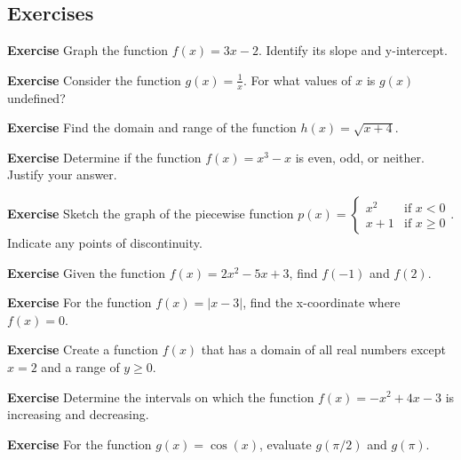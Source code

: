 \documentclass[a4paper,12pt]{book}
\newenvironment{exercise}[1][]
  {\par\medskip\noindent\textbf{Exercise #1} \rmfamily}
  {\medskip}
\begin{document}
\subsection{Exercises}
\begin{exercise}
Graph the function \( f(x) = 3x - 2 \). Identify its slope and y-intercept.
\end{exercise}

\begin{exercise}
Consider the function \( g(x) = \frac{1}{x} \). For what values of \( x \) is \( g(x) \) undefined?
\end{exercise}

\begin{exercise}
Find the domain and range of the function \( h(x) = \sqrt{x + 4} \).
\end{exercise}

\begin{exercise}
Determine if the function \( f(x) = x^3 - x \) is even, odd, or neither. Justify your answer.
\end{exercise}

\begin{exercise}
Sketch the graph of the piecewise function \( p(x) = \left\{\begin{array}{ll} x^2 & \text{if } x < 0 \\ x + 1 & \text{if } x \geq 0 \end{array}\right. \). Indicate any points of discontinuity.
\end{exercise}

\begin{exercise}
Given the function \( f(x) = 2x^2 - 5x + 3 \), find \( f(-1) \) and \( f(2) \).
\end{exercise}

\begin{exercise}
For the function \( f(x) = |x - 3| \), find the x-coordinate where \( f(x) = 0 \).
\end{exercise}

\begin{exercise}
Create a function \( f(x) \) that has a domain of all real numbers except \( x = 2 \) and a range of \( y \geq 0 \).
\end{exercise}

\begin{exercise}
Determine the intervals on which the function \( f(x) = -x^2 + 4x - 3 \) is increasing and decreasing.
\end{exercise}

\begin{exercise}
For the function \( g(x) = \cos(x) \), evaluate \( g(\pi/2) \) and \( g(\pi) \).
\end{exercise}
\end{document}
